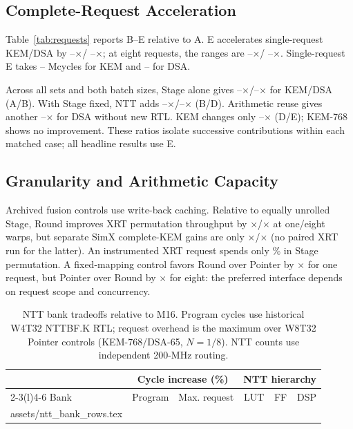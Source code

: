 \documentclass[conference,letterpaper]{IEEEtran}
\makeatletter
\newcommand{\tablerows}[1]{\@@input #1 }
\makeatother
\begin{document}
\subsection{Complete-Request Acceleration}
Table~\ref{tab:requests} reports B--E relative to A. E accelerates
single-request KEM/DSA by
\KemParameterMinOne{}--\KemParameterMaxOne{}$\times$/
\DsaParameterMinOne{}--\DsaParameterMaxOne{}$\times$; at eight requests,
the ranges are \KemParameterMinEight{}--\KemParameterMaxEight{}$\times$/
\DsaParameterMinEight{}--\DsaParameterMaxEight{}$\times$.
Single-request E takes \KemRequestMcyclesMin{}--\KemRequestMcyclesMax{}
Mcycles for KEM and \DsaRequestMcyclesMin{}--\DsaRequestMcyclesMax{} for DSA.

Across all sets and both batch sizes, Stage alone gives
\KemStageMin{}--\KemStageMax{}$\times$/\DsaStageMin{}--\DsaStageMax{}$\times$
for KEM/DSA (A/B). With Stage fixed, NTT adds
\KemNttMin{}--\KemNttMax{}$\times$/\DsaNttMin{}--\DsaNttMax{}$\times$ (B/D).
Arithmetic reuse gives another \DsaArithmeticMin{}--\DsaArithmeticMax{}$\times$
for DSA without new RTL. KEM changes only
\KemArithmeticMin{}--\KemArithmeticMax{}$\times$ (D/E); KEM-768 shows no
improvement. These ratios isolate successive contributions within each
matched case; all headline results use E.

\subsection{Granularity and Arithmetic Capacity}
Archived fusion controls use write-back caching. Relative to equally unrolled
Stage, Round improves XRT permutation throughput by
\FusionOne{}$\times$/\FusionEight{}$\times$ at one/eight warps, but separate
SimX complete-KEM gains are only \FusionKemOne{}$\times$/\FusionKemEight{}$\times$
(no paired XRT run for the latter). An instrumented XRT request spends only
\StagePermPct{}\% in Stage permutation. A fixed-mapping control favors Round
over Pointer by \RoundVsPointerOne{}$\times$ for one request, but Pointer
over Round by \PointerVsRoundEight{}$\times$ for eight: the preferred
interface depends on request scope and concurrency.

\begin{table}[t]
\caption{NTT bank tradeoffs relative to M16. Program cycles use historical
W4T32 NTTBF.K RTL; request overhead is the maximum over W8T32 Pointer
controls (KEM-768/DSA-65, $N=1/8$). NTT counts use independent 200-MHz routing.}
\label{tab:bank}
\centering\footnotesize
\begin{tabular*}{\columnwidth}{@{\extracolsep{\fill}}lrrrrr@{}}
\toprule
& \multicolumn{2}{c}{Cycle increase (\%)} & \multicolumn{3}{c}{NTT hierarchy}\\
\cmidrule(lr){2-3}\cmidrule(l){4-6}
Bank & Program & Max. request & LUT & FF & DSP\\
\midrule
\tablerows{assets/ntt_bank_rows.tex}
\bottomrule
\end{tabular*}
\end{table}
\end{document}
